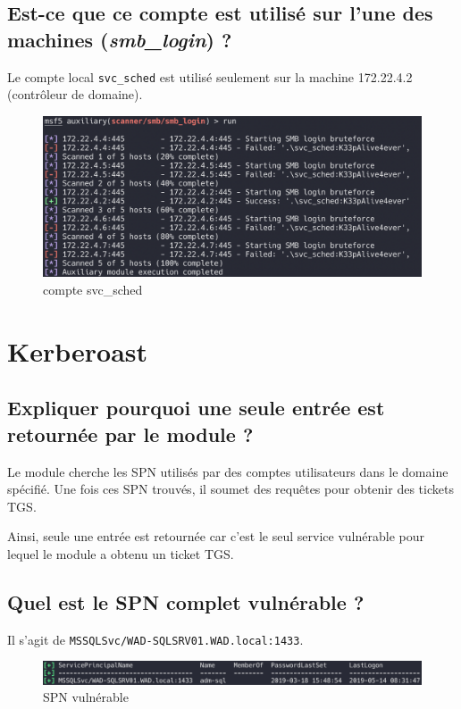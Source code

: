 \documentclass{extarticle} %
\begin{document}
    \subsection{Est-ce que ce compte est utilisé sur l’une des machines (\textit{smb\_login}) ?}
    Le compte local \texttt{svc\_sched} est utilisé seulement sur la machine 172.22.4.2 (contrôleur de domaine).

    \begin{figure}[H]
        \centering
        \includegraphics[scale=0.4]{images/p17.png}
        \caption{compte svc\_sched}
    \end{figure}

    \section{Kerberoast}

    \subsection{Expliquer pourquoi une seule entrée est retournée par le module ?}
    Le module cherche les SPN utilisés par des comptes utilisateurs dans le domaine spécifié. Une fois ces SPN trouvés, il soumet des requêtes
    pour obtenir des tickets TGS.

    Ainsi, seule une entrée est retournée car c'est le seul service vulnérable pour lequel le module a obtenu un ticket TGS.

    \subsection{Quel est le SPN complet vulnérable ?}
    Il s'agit de \texttt{MSSQLSvc/WAD-SQLSRV01.WAD.local:1433}.

    \begin{figure}[H]
        \centering
        \includegraphics[scale=0.5]{images/SPN-vulnerable.png}
        \caption{SPN vulnérable}
    \end{figure}
\end{document}
